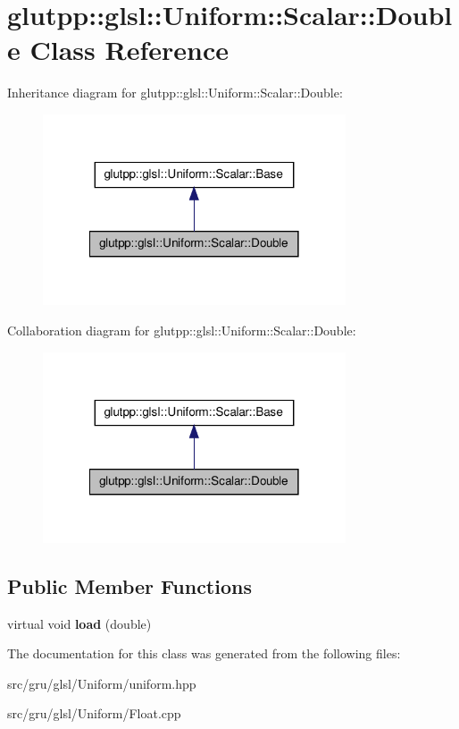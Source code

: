 \hypertarget{classglutpp_1_1glsl_1_1Uniform_1_1Scalar_1_1Double}{\section{glutpp\-:\-:glsl\-:\-:\-Uniform\-:\-:\-Scalar\-:\-:\-Double \-Class \-Reference}
\label{classglutpp_1_1glsl_1_1Uniform_1_1Scalar_1_1Double}
}


\-Inheritance diagram for glutpp\-:\-:glsl\-:\-:\-Uniform\-:\-:\-Scalar\-:\-:\-Double\-:
\nopagebreak
\begin{figure}[H]
\begin{center}
\leavevmode
\includegraphics[width=254pt]{classglutpp_1_1glsl_1_1Uniform_1_1Scalar_1_1Double__inherit__graph}
\end{center}
\end{figure}


\-Collaboration diagram for glutpp\-:\-:glsl\-:\-:\-Uniform\-:\-:\-Scalar\-:\-:\-Double\-:
\nopagebreak
\begin{figure}[H]
\begin{center}
\leavevmode
\includegraphics[width=254pt]{classglutpp_1_1glsl_1_1Uniform_1_1Scalar_1_1Double__coll__graph}
\end{center}
\end{figure}
\subsection*{\-Public \-Member \-Functions}
\begin{DoxyCompactItemize}
\item 
\hypertarget{classglutpp_1_1glsl_1_1Uniform_1_1Scalar_1_1Double_ace7c6e19de12c3d9e495117944b40249}{virtual void {\bfseries load} (double)}\label{classglutpp_1_1glsl_1_1Uniform_1_1Scalar_1_1Double_ace7c6e19de12c3d9e495117944b40249}

\end{DoxyCompactItemize}


\-The documentation for this class was generated from the following files\-:\begin{DoxyCompactItemize}
\item 
src/gru/glsl/\-Uniform/uniform.\-hpp\item 
src/gru/glsl/\-Uniform/\-Float.\-cpp\end{DoxyCompactItemize}
